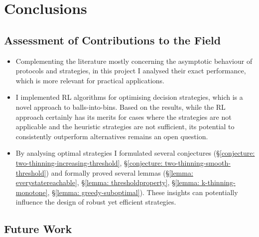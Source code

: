 
\chapter{Conclusions}\label{conclusion}

\ifpdf
    \graphicspath{{Chapter3/Figs/Raster/}{Chapter3/Figs/PDF/}{Chapter3/Figs/}}
\else
    \graphicspath{{Chapter3/Figs/Vector/}{Chapter3/Figs/}}
\fi


\section{Assessment of Contributions to the Field}


\begin{itemize}
    \item Complementing the literature mostly concerning the asymptotic behaviour of protocols and strategies, in this project I analysed their exact performance, which is more relevant for practical applications.
    \item I implemented RL algorithms for optimising decision strategies, which is a novel approach to balls-into-bins. Based on the results, while the RL approach certainly has its merits for cases where the \DP strategies are not applicable and the heuristic strategies are not sufficient, its potential to consistently outperform alternatives remains an open question.
    \item By analysing optimal strategies I formulated several conjectures (\S\ref{conjecture: two-thinning-increasing-threshold}, \S\ref{conjecture: two-thinning-smooth-threshold}) and formally proved several lemmas (\S\ref{lemma: everystatereachable}, \S\ref{lemma: thresholdproperty}, \S\ref{lemma: k-thinning-monotone}, \S\ref{lemma: greedy-suboptimal}). These insights can potentially influence the design of robust yet efficient strategies.
\end{itemize}


\section{Future Work}

